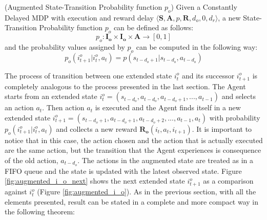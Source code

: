                 \begin{definition}(Augmented State-Transition Probability function $p_o$)
                    \label{def:obsaugmenttrans}
                    Given a Constantly Delayed MDP with execution and reward delay $\langle \mathbf{S}, \mathbf{A}, p, \mathbf{R}, d_o, 0, d_r \rangle$,
                    a new State-Transition Probability function $p_o$ can be defined as follows:
                    \[ p_o :  \mathbf{I_{o}} \times \mathbf{I_{o}} \times \mathbf{A} \rightarrow [0, 1]\]
                    and the probability values assigned by $p_o$ can be computed in the following way:
                    \[ p_o \left( i_{t+1}^o | i_t^o , a_t  \right) = p ( s_{t-d_{o}+1} | s_{t-d_{o}}, a_{t-d_{o}} ) \]
                \end{definition}                
                
                The process of transition between one extended state $i^o_t$ and its successor $i^o_{t+1}$ is completely analogous to the process presented in the last section. The Agent starts from an extended state $i^o_t = \left( s_{t-d_{o}}, a_{t-d_{o}}, a_{t-d_{o}+1}, ...,  a_{t-1}\right)$ and selects an action $a_t$. Then action $a_t$ is executed and the Agent finds itself in a new extended state $i^o_{t+1} = \left( s_{t-d_{o}+1}, a_{t-d_{o}+1}, a_{t-d_{o}+2}, ...,  a_{t-1}, a_{t}\right)$ with probability $p_o \left( i_{t+1}^o | i_t^o , a_t  \right)$ and collects a new reward $\mathbf{R_{o}}\left( i_t, a_{t}, i_{t+1} \right)$. It is important to notice that in this case, the action chosen and the action that is actually executed are the same action, but the transition that the Agent experiences is consequence of the old action, $a_{t-d_{o}}$. The actions in the augmented state are treated as in a FIFO queue and the state is updated with the latest observed state. Figure \ref{fig:augmented_i_o_next} shows the next extended state $i^o_{t+1}$ as a comparison against $i^o_t$ (Figure \ref{fig:augmented_i_o}).
                As in the previous section, with all the elements presented,  result can be stated in a complete and more compact way in the following theorem:
                
